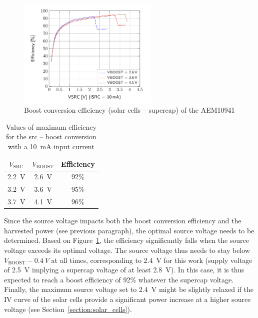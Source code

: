 \documentclass{EPL-master-thesis-covers-EN}
\newcommand{\te}[1]{\textrm{#1}}
\begin{document}
\begin{figure}[H]
    \centering
    \includegraphics[width=0.6\textwidth]{boost_efficiency.pdf}
    \caption{Boost conversion efficiency (solar cells -- supercap) of the AEM10941}
    \label{fig:boost_efficiency}
\end{figure}

\begin{table}[H]
\centering
\begin{tabular}{ccc}
\toprule
 $V_\te{SRC}$ & $V_\te{BOOST}$ & Efficiency \\ \midrule
 \SI{2.2}{V}  & \SI{2.6}{V}    & 92\%      \\
 \SI{3.2}{V}  & \SI{3.6}{V}    & 95\%      \\
 \SI{3.7}{V}  & \SI{4.1}{V}    & 96\%      \\ \bottomrule
\end{tabular}
\caption{Values of maximum efficiency for the src -- boost conversion with a \SI{10}{mA} input current}
\label{tab:max_eff_PMU}
\end{table}

Since the source voltage impacts both the boost conversion efficiency and the harvested power (see previous paragraph), the optimal source voltage needs to be determined. Based on Figure~\ref{fig:boost_efficiency}, the efficiency significantly falls when the source voltage exceeds its optimal voltage. The source voltage thus needs to stay below $V_\te{BOOST} - \SI{0.4}{V}$ at all times, corresponding to \SI{2.4}{V} for this work (supply voltage of \SI{2.5}{V} implying a supercap voltage of at least \SI{2.8}{V}). In this case, it is thus expected to reach a boost efficiency of 92\% whatever the supercap voltage. Finally, the maximum source voltage set to \SI{2.4}{V} might be slightly relaxed if the IV curve of the solar cells provide a significant power increase at a higher source voltage (see Section~\ref{section:solar_cells}).
\end{document}

